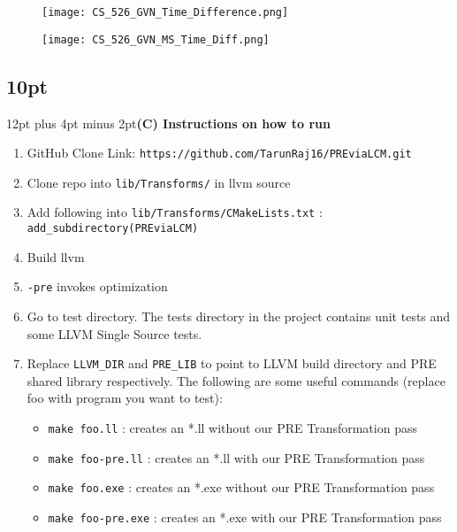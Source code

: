 \documentclass[onecolumn,10pt]{journal}
\begin{document}
\begin{figure}[h] 
\centering
\texttt{[image: CS\_526\_GVN\_Time\_Difference.png]}
\caption{}
\end{figure}

\begin{figure}[h] 
\centering
\texttt{[image: CS\_526\_GVN\_MS\_Time\_Diff.png]}
\caption{}
\end{figure}

\pagebreak

\titlespacing\subsection*{10pt}{12pt plus 4pt minus 2pt}\textbf{(C) Instructions on how to run}
\begin{enumerate}
\item GitHub Clone Link: \texttt{https://github.com/TarunRaj16/PREviaLCM.git}

\item Clone repo into \texttt{lib/Transforms/} in llvm source

\item Add following into \texttt{lib/Transforms/CMakeLists.txt} : \texttt{add\_subdirectory(PREviaLCM)}

\item Build llvm

\item \texttt{-pre} invokes optimization

\item Go to test directory. The tests directory in the project contains unit tests and some LLVM Single Source tests. 

\item Replace \texttt{LLVM\_DIR} and \texttt{PRE\_LIB} to point to LLVM build directory and PRE shared library respectively. The following are some useful commands (replace foo with program you want to test):

\begin{itemize}
\item \texttt{make foo.ll} : creates an *.ll without our PRE Transformation pass
\item \texttt{make foo-pre.ll} : creates an *.ll with our PRE Transformation pass
\item \texttt{make foo.exe} : creates an *.exe without our PRE Transformation pass
\item \texttt{make foo-pre.exe} : creates an *.exe with our PRE Transformation pass
\end{itemize}

\end{enumerate}
\end{document}
